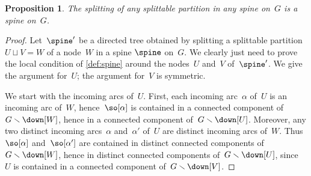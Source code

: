 \documentclass{amsart}
\newtheorem{proposition}[theorem]{Proposition}
\theoremstyle{definition}
\newtheorem{remark}[theorem]{Remark}
\newcommand{\ssm}{\smallsetminus} %
\begin{document}
\begin{proposition}
  \label{prop:nodeSplitting} 
  The splitting of any splittable partition in any spine on~$G$ is a spine on~$G$.
\end{proposition}


\begin{proof}
  Let~$\spine'$ be a directed tree obtained by splitting a splittable partition~$U \sqcup V = W$ of a node~$W$ in a spine $\spine$ on~$G$.
  We clearly just need to prove the local condition of \cref{def:spine} around the nodes~$U$ and~$V$ of~$\spine'$.
  We give the argument for~$U$; the argument for~$V$ is symmetric.
  
  We start with the incoming arcs of~$U$.
  First, each incoming arc~$\alpha$ of~$U$ is an incoming arc of~$W$, hence~$\so[\alpha]$ is contained in a connected component of~$G \ssm \down[W]$, hence in a connected component of~$G \ssm \down[U]$.
  Moreover, any two distinct incoming arcs~$\alpha$ and~$\alpha'$ of~$U$ are distinct incoming arcs of~$W$. Thus~$\so[\alpha]$ and~$\so[\alpha']$ are contained in distinct connected components of~$G \ssm \down[W]$, hence in distinct connected components of~$G \ssm \down[U]$, since~$U$ is contained in a connected component of~$G \ssm \down[V]$.


\end{proof}
\end{document}
